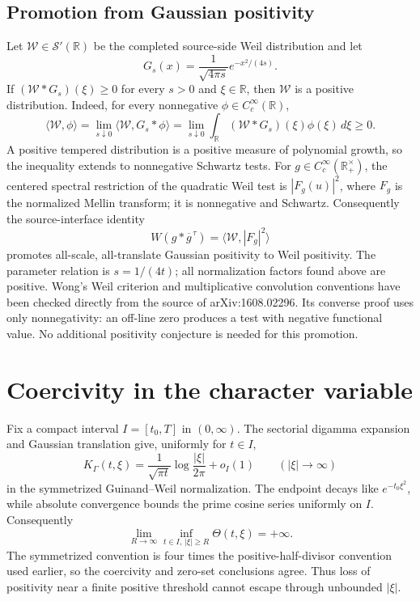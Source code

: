 \documentclass[11pt]{article}
\begin{document}
\subsection{Promotion from Gaussian positivity}
Let $\mathcal W\in\mathcal S'(\mathbb R)$ be the completed source-side Weil distribution and let
\[
 G_s(x)=\frac{1}{\sqrt{4\pi s}}e^{-x^2/(4s)}.
\]
If $(\mathcal W*G_s)(\xi)\ge0$ for every $s>0$ and $\xi\in\mathbb R$, then $\mathcal W$ is a positive distribution. Indeed, for every nonnegative $\phi\in C_c^\infty(\mathbb R)$,
\[
 \langle\mathcal W,\phi\rangle
 =\lim_{s\downarrow0}\langle\mathcal W,G_s*\phi\rangle
 =\lim_{s\downarrow0}\int_{\mathbb R}(\mathcal W*G_s)(\xi)\phi(\xi)\,d\xi
 \ge0.
\]
A positive tempered distribution is a positive measure of polynomial growth, so the inequality extends to nonnegative Schwartz tests. For $g\in C_c^\infty(\mathbb R_+^\times)$, the centered spectral restriction of the quadratic Weil test is $|F_g(u)|^2$, where $F_g$ is the normalized Mellin transform; it is nonnegative and Schwartz. Consequently the source-interface identity
\[
 W(g*\overline g^{\,\tau})=\langle\mathcal W,|F_g|^2\rangle
\]
promotes all-scale, all-translate Gaussian positivity to Weil positivity. The parameter relation is $s=1/(4t)$; all normalization factors found above are positive. Wong's Weil criterion and multiplicative convolution conventions have been checked directly from the source of arXiv:1608.02296. Its converse proof uses only nonnegativity: an off-line zero produces a test with negative functional value. No additional positivity conjecture is needed for this promotion.

\section{Coercivity in the character variable}
Fix a compact interval $I=[t_0,T]$ in $(0,\infty)$. The sectorial digamma expansion and Gaussian translation give, uniformly for $t\in I$,
\[
 K_\Gamma(t,\xi)=\frac{1}{\sqrt{\pi t}}
 \log\frac{|\xi|}{2\pi}+o_I(1)
 \qquad(|\xi|\to\infty)
\]
in the symmetrized Guinand--Weil normalization. The endpoint decays like $e^{-t_0\xi^2}$, while absolute convergence bounds the prime cosine series uniformly on $I$. Consequently
\[
 \lim_{R\to\infty}\inf_{t\in I,\,|\xi|\ge R}\Theta(t,\xi)=+\infty.
\]
The symmetrized convention is four times the positive-half-divisor convention used earlier, so the coercivity and zero-set conclusions agree. Thus loss of positivity near a finite positive threshold cannot escape through unbounded $|\xi|$.
\end{document}
